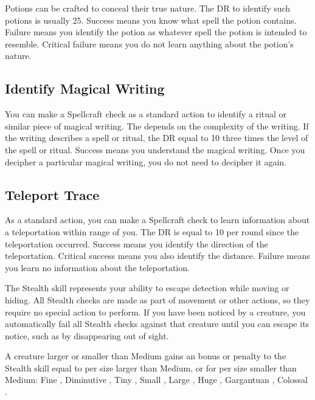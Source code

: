         Potions can be crafted to conceal their true nature.
        The DR to identify such potions is usually 25.
        Success means you know what spell the potion contains.
        Failure means you identify the potion as whatever spell the potion is intended to resemble.
        Critical failure means you do not learn anything about the potion's nature.

    \subsection{Identify Magical Writing}\label{Identify Magical Writing}
        You can make a Spellcraft check as a standard action to identify a ritual or similar piece of magical writing.
        The  depends on the complexity of the writing.
        If the writing describes a spell or ritual, the DR equal to 10 \add three times the level of the spell or ritual.
        Success means you understand the magical writing.
        Once you decipher a particular magical writing, you do not need to decipher it again.

    \subsection{Teleport Trace}
        As a standard action, you can make a Spellcraft check to learn information about a teleportation within \rngmed range of you.
        The DR is equal to 10  per round since the teleportation occurred.
        Success means you identify the direction of the teleportation.
        Critical success means you also identify the distance.
        Failure means you learn no information about the teleportation.

\newpage
{}
        The Stealth skill represents your ability to escape detection while moving or hiding. All Stealth checks are made as part of movement or other actions, so they require no special action to perform. If you have been noticed by a creature, you automatically fail all Stealth checks against that creature until you can escape its notice, such as by disappearing out of sight.

        \label{Size and Stealth} A creature larger or smaller than Medium gains an bonus or penalty to the Stealth skill equal to  per size larger than Medium, or  for per size smaller than Medium: Fine , Diminutive , Tiny , Small , Large , Huge , Gargantuan , Colossal .

